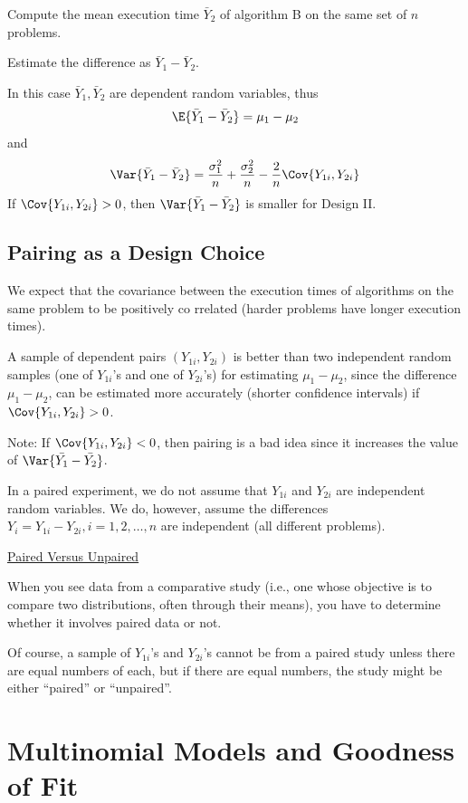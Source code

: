 \documentclass[oneside]{book}
\begin{document}
Compute the mean execution time $\bar{Y}_{2}$ of algorithm B on the same set of $n$ problems.

Estimate the difference as $\bar{Y}_{1}-\bar{Y}_{2}$.

In this case $\bar{Y}_{1}, \bar{Y}_{2}$ are dependent random variables, thus
\[\E{\bar{Y}_{1}-\bar{Y}_{2}}=\mu_{1}-\mu_{2}\]
and
\[\Var{\bar{Y}_{1}-\bar{Y}_{2}}
    =\frac{\sigma_{1}^{2}}{n}+
    \frac{\sigma_{2}^{2}}{n}-\frac{2}{n}
    \Cov{Y_{1 i}, Y_{2 i}}
\]
If $ \Cov{Y_{1 i}, Y_{2 i}}>0$,
then $ \Var{\bar{Y}_{1}-\bar{Y}_{2}}$ is smaller for Design II\@.

\subsection{Pairing as a Design Choice}

We expect that the covariance between the execution times of algorithms on the same problem to be
positively co rrelated (harder problems have longer execution times).

A sample of dependent pairs $\left(Y_{1 i}, Y_{2 i}\right)$ is better than two
independent random samples (one of $Y_{1 i}$'s and one of $Y_{2 i}$'s) for
estimating $\mu_{1}-\mu_{2}$, since the difference $\mu_{1}-\mu_{2}$,
can be estimated more accurately (shorter confidence intervals)
if $\Cov{Y_{1 i}, Y_{2 i}}>0$.

Note: If $\Cov{Y_{1 i}, Y_{2 i}}<0$,
then pairing is a bad idea since it increases the value of
$\Var{\bar{Y_{1}}-\bar{Y_{2}}}$.

In a paired experiment, we do not
assume that $Y_{1 i}$ and $Y_{2 i}$ are independent random variables.
We do, however, assume the differences $Y_{i}=Y_{1 i}-Y_{2 i}, i=1,2, \ldots, n$
are independent (all different problems).

\underline{Paired Versus Unpaired}

When you see data from a comparative study (i.e., one
whose objective is to compare two distributions, often through their means),
you have to determine whether it involves paired data or not.

Of course, a sample of $Y_{1 i}$'s and $Y_{2 i}$'s cannot be
from a paired study unless there are equal numbers of each, but
if there are equal numbers, the study might be either ``paired'' or
``unpaired''.

\section{Multinomial Models and Goodness of Fit}
\end{document}
